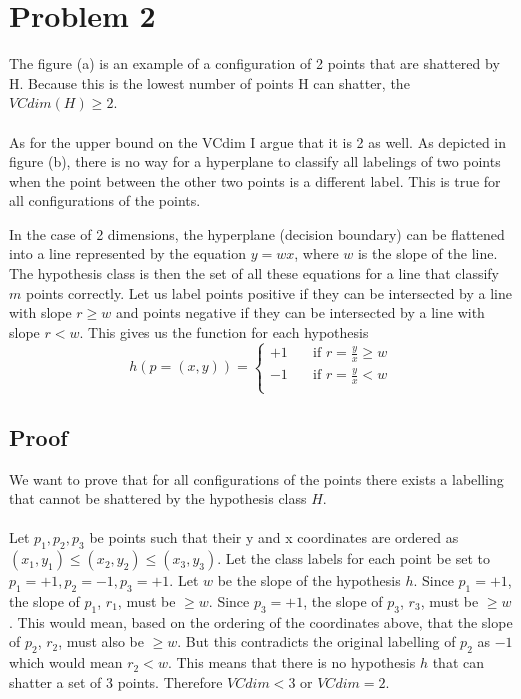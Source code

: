 \documentclass[12pt]{article}
\begin{document}
\section*{Problem 2}
\begin{figure}[H]
\centering
\centering
\end{figure}
The figure (a) is an example of a configuration of 2 points that are shattered by H.  Because this is the lowest number of points H can shatter, the $VCdim(H) \ge 2$.\\
\\
As for the upper bound on the VCdim I argue that it is 2 as well.  As depicted in figure (b), there is no way for a hyperplane to classify all labelings of two points when the point between the other two points is a different label.  This is true for all configurations of the points.
\begin{figure}[H]
\centering
\centering
\end{figure}
\noindent
In the case of 2 dimensions, the hyperplane (decision boundary) can be flattened into a line represented by the equation $y = wx$, where $w$ is the slope of the line.  The hypothesis class is then the set of all these equations for a line that classify $m$ points correctly.  Let us label points positive if they can be intersected by a line with slope $r \ge w$ and points negative if they can be intersected by a line with slope $r < w$.  This gives us the function for each hypothesis 
\[
  h(p = (x,y)) = 
  \begin{cases}
  +1 & \quad \text{if } r = \frac{y}{x} \ge w \\
  -1 & \quad \text{if } r = \frac{y}{x} < w \\
  \end{cases}
\]
\subsection*{Proof}
We want to prove that for all configurations of the points there exists a labelling that cannot be shattered by the hypothesis class $H$.\\
\\
Let $p_1, p_2, p_3$ be points such that their y and x coordinates are ordered as $(x_1,y_1) \le (x_2,y_2) \le (x_3,y_3)$.  Let the class labels for each point be set to $p_1 = +1, p_2 = -1, p_3 = +1$.  Let $w$ be the slope of the hypothesis $h$.  Since $p_1 = +1$, the slope of $p_1$, $r_1$, must be $\ge w$.  Since $p_3 = +1$, the slope of $p_3$, $r_3$, must be $ \ge w$.  This would mean, based on the ordering of the coordinates above, that the slope of $p_2$, $r_2$, must also be $\ge w$.  But this contradicts the original labelling of $p_2$ as $-1$ which would mean $r_2 < w$.  This means that there is no hypothesis $h$ that can shatter a set of 3 points.  Therefore $VCdim < 3$ or $VCdim = 2$.
\end{document}

